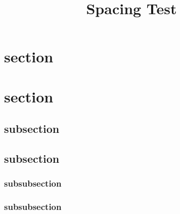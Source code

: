 \documentclass{article}
\title{Spacing Test}
\begin{document}
    \maketitle

    \section{section}
    \lipsum[2]
    \section{section}
    \lipsum[2]

    \subsection{subsection}
    \lipsum[2]
    \subsection{subsection}
    \lipsum[2]

    \subsubsection{subsubsection}
    \lipsum[2]
    \subsubsection{subsubsection}
    \lipsum[2]

    \begin{singlespace}  %
        \lipsum[2]
    \end{singlespace}
\end{document}
